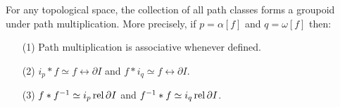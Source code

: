 \begin{theorem}\label{4.1.4}
    For any topological space, the collection of all path classes forms a
    groupoid under path multiplication. More precisely, if $p=\alpha[f]$ and
    $q=\omega[f]$ then:
    \begin{enumerate}
        \item[(1)] Path multiplication is associative whenever defined.

        \item[(2)] $i_p \ast f \simeq f \rel{\partial{I}}$ and  $f \ast i_q
            \simeq f \rel{\partial{I}}$.

        \item[(3)] $f \ast f^{-1} \simeq i_p \operatorname{rel}{\partial{I}}$ and $f^{-1}
            \ast f \simeq i_q \operatorname{rel}{\partial{I}}$.
    \end{enumerate}
\end{theorem}
